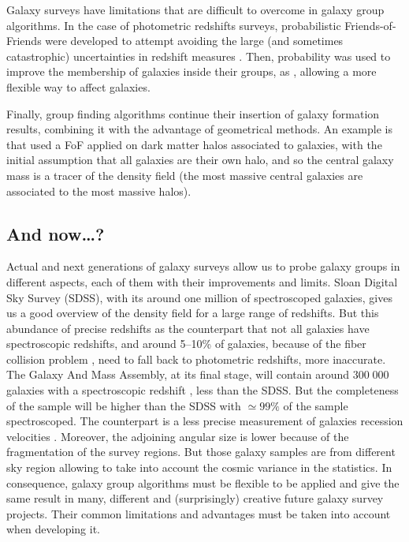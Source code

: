 Galaxy surveys have limitations that are difficult to overcome in galaxy group
algorithms. In the case of photometric redshifts surveys, probabilistic
Friends-of-Friends were developed to attempt avoiding the large (and sometimes
catastrophic) uncertainties in redshift measures \citep{Liu+08}. Then,
probability was used to improve the membership of galaxies inside their groups,
as \citet{DominguezRomero+12}, allowing a more flexible way to affect galaxies.

Finally, group finding algorithms continue their insertion of galaxy formation
results, combining it with the advantage of geometrical methods. An example is
\citet{MunozCuartas+12} that used a FoF applied on dark matter halos associated
to galaxies, with the initial assumption that all galaxies are their own halo,
and so the central galaxy mass is a tracer of the density field (the most
massive central galaxies are associated to the most massive halos).

\subsection{And now\ldots?}
\label{sub:and_now}

Actual and next generations of galaxy surveys allow us to probe galaxy groups
in different aspects, each of them with their improvements and limits. Sloan
Digital Sky Survey (SDSS), with its around one million of spectroscoped
galaxies, gives us a good overview of the density field for a large range of
redshifts. But this abundance of precise redshifts as the counterpart that not
all galaxies have spectroscopic redshifts, and around 5--10\% of galaxies,
because of the fiber collision problem \citep{Blanton+03}, need to fall back to
photometric redshifts, more inaccurate. The Galaxy And Mass Assembly, at its
final stage, will contain around $300\;000$ galaxies with a spectroscopic
redshift \citep{Hopkins+13}, less than the SDSS\@. But the completeness of the
sample will be higher than the SDSS with $\simeq99\%$ of the sample
spectroscoped. The counterpart is a less precise measurement of galaxies
recession velocities \citep{Robotham+11,Hopkins+13}. Moreover, the adjoining
angular size is lower because of the fragmentation of the survey regions. But
those galaxy samples are from different sky region allowing to take into
account the cosmic variance in the statistics. In consequence, galaxy group
algorithms must be flexible to be applied and give the same result in many,
different and (surprisingly) creative future galaxy survey projects. Their
common limitations and advantages must be taken into account when developing
it.

